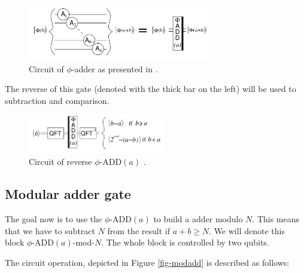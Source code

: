 \documentclass[a4paper, 10pt]{article}
\numberwithin{equation}{section}
\numberwithin{figure}{section}
\numberwithin{table}{section}
\begin{document}
\begin{figure}[h!]
	\centering
	\includegraphics[width=8cm]{Figures/adder2}
	\caption{Circuit of $\phi$-adder as presented in \cite{beauregard}.}
\end{figure}

The reverse of this gate (denoted with the thick bar on the left) will be used to subtraction and comparison.

\begin{figure}[h!]
	\centering
	\includegraphics[width=6cm]{Figures/adder3}
	\caption{Circuit of reverse $\phi$-ADD$(a)$ \cite{beauregard}.}
\end{figure}

\subsection{Modular adder gate}

The goal now is to use the $\phi$-ADD$(a)$ to build a adder modulo $N$. This means that we have to subtract $N$ from the result if $a+b \ge N$. We will denote this block $\phi$-ADD$(a)$-mod-$N$. The whole block is controlled by two qubits.

The circuit operation, depicted in Figure \ref{fig-modadd} is described as follows:
\end{document}
